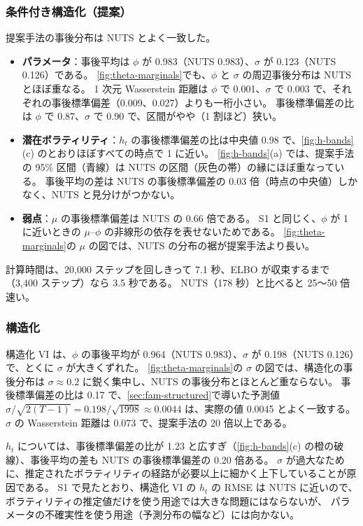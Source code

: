 \subsubsection{条件付き構造化（提案）}

提案手法の事後分布は NUTS とよく一致した。
\begin{itemize}
  \item \textbf{パラメータ}：事後平均は $\phi$ が 0.983（NUTS 0.983）、$\sigma$ が 0.123（NUTS 0.126）である。
    \cref{fig:theta-marginals}でも、$\phi$ と $\sigma$ の周辺事後分布は NUTS とほぼ重なる。
    1 次元 Wasserstein 距離は $\phi$ で 0.001、$\sigma$ で 0.003 で、それぞれの事後標準偏差（0.009、0.027）よりも一桁小さい。
    事後標準偏差の比は $\phi$ で 0.87、$\sigma$ で 0.90 で、区間がやや（1 割ほど）狭い。
  \item \textbf{潜在ボラティリティ}：$h_t$ の事後標準偏差の比は中央値 0.98 で、\cref{fig:h-bands}(c) のとおりほぼすべての時点で 1 に近い。
    \cref{fig:h-bands}(a) では、提案手法の 95\% 区間（青線）は NUTS の区間（灰色の帯）の縁にほぼ重なっている。
    事後平均の差は NUTS の事後標準偏差の 0.03 倍（時点の中央値）しかなく、NUTS と見分けがつかない。
  \item \textbf{弱点}：$\mu$ の事後標準偏差は NUTS の 0.66 倍である。
    S1 と同じく、$\phi$ が 1 に近いときの $\mu$–$\phi$ の非線形の依存を表せないためである。
    \cref{fig:theta-marginals}の $\mu$ の図では、NUTS の分布の裾が提案手法より長い。
\end{itemize}

計算時間は、20,000 ステップを回しきって 7.1 秒、ELBO が収束するまで（3,400 ステップ）なら 3.5 秒である。
NUTS（178 秒）と比べると 25〜50 倍速い。

\subsubsection{構造化}

構造化 VI は、$\phi$ の事後平均が 0.964（NUTS 0.983）、$\sigma$ が 0.198（NUTS 0.126）で、とくに $\sigma$ が大きくずれた。
\cref{fig:theta-marginals}の $\sigma$ の図では、構造化の事後分布は $\sigma \approx 0.2$ に鋭く集中し、NUTS の事後分布とほとんど重ならない。
事後標準偏差の比は 0.17 で、\cref{sec:fam-structured}で導いた予測値 $\sigma / \sqrt{2(T-1)} = 0.198 / \sqrt{1998} \approx 0.0044$ は、実際の値 0.0045 とよく一致する。
$\sigma$ の Wasserstein 距離は 0.073 で、提案手法の 20 倍以上である。

$h_t$ については、事後標準偏差の比が 1.23 と広すぎ（\cref{fig:h-bands}(c) の橙の破線）、事後平均の差も NUTS の事後標準偏差の 0.20 倍ある。
$\sigma$ が過大なために、推定されたボラティリティの経路が必要以上に細かく上下していることが原因である。
S1 で見たとおり、構造化 VI の $h_t$ の RMSE は NUTS に近いので、ボラティリティの推定値だけを使う用途では大きな問題にはならないが、
パラメータの不確実性を使う用途（予測分布の幅など）には向かない。

